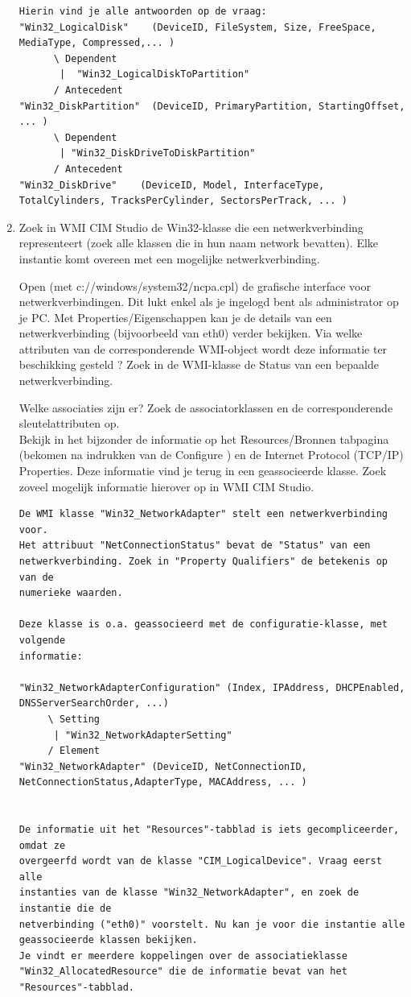 \documentclass[11pt,a4paper]{report}
\begin{document}
\begin{enumerate}[resume]
\begin{lstlisting}
Hierin vind je alle antwoorden op de vraag:
"Win32_LogicalDisk"    (DeviceID, FileSystem, Size, FreeSpace, MediaType, Compressed,... )
      \ Dependent
       |  "Win32_LogicalDiskToPartition"
      / Antecedent
"Win32_DiskPartition"  (DeviceID, PrimaryPartition, StartingOffset, ... )
      \ Dependent
       | "Win32_DiskDriveToDiskPartition"
      / Antecedent
"Win32_DiskDrive"    (DeviceID, Model, InterfaceType, TotalCylinders, TracksPerCylinder, SectorsPerTrack, ... )
	\end{lstlisting}
	\item Zoek in WMI CIM Studio de Win32-klasse die een netwerkverbinding representeert (zoek alle klassen die in hun naam network bevatten). Elke instantie komt overeen met een mogelijke netwerkverbinding.
	\par Open (met c://windows/system32/ncpa.cpl) de grafische interface voor netwerkverbindingen. Dit lukt enkel als je ingelogd bent als administrator op je PC. Met Properties/Eigenschappen kan je de details van een netwerkverbinding (bijvoorbeeld van eth0) verder bekijken. Via welke attributen van de corresponderende WMI-object wordt deze informatie ter beschikking gesteld ? Zoek in de WMI-klasse de Status van een bepaalde netwerkverbinding.
	\par Welke associaties zijn er? Zoek de associatorklassen en de corresponderende sleutelattributen op.\\
	Bekijk in het bijzonder de informatie op het Resources/Bronnen tabpagina (bekomen na indrukken van de Configure ) en de Internet Protocol (TCP/IP) Properties. Deze informatie vind je terug in een geassocieerde klasse.
	Zoek zoveel mogelijk informatie hierover op in WMI CIM Studio.
	\begin{lstlisting}
De WMI klasse "Win32_NetworkAdapter" stelt een netwerkverbinding voor.
Het attribuut "NetConnectionStatus" bevat de "Status" van een 
netwerkverbinding. Zoek in "Property Qualifiers" de betekenis op van de 
numerieke waarden.

Deze klasse is o.a. geassocieerd met de configuratie-klasse, met volgende 
informatie:

"Win32_NetworkAdapterConfiguration" (Index, IPAddress, DHCPEnabled, DNSServerSearchOrder, ...)
     \ Setting
      | "Win32_NetworkAdapterSetting"
     / Element
"Win32_NetworkAdapter" (DeviceID, NetConnectionID, NetConnectionStatus,AdapterType, MACAddress, ... )


De informatie uit het "Resources"-tabblad is iets gecompliceerder, omdat ze 
overgeerfd wordt van de klasse "CIM_LogicalDevice". Vraag eerst alle 
instanties van de klasse "Win32_NetworkAdapter", en zoek de instantie die de 
netverbinding ("eth0)" voorstelt. Nu kan je voor die instantie alle 
geassocieerde klassen bekijken. 
Je vindt er meerdere koppelingen over de associatieklasse 
"Win32_AllocatedResource" die de informatie bevat van het "Resources"-tabblad. 


\end{lstlisting}
\end{enumerate}
\end{document}

